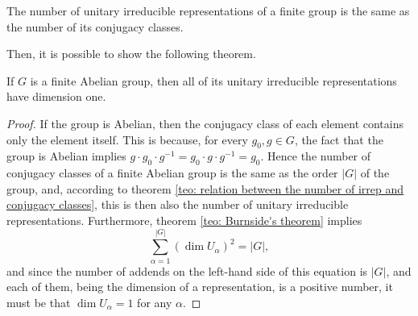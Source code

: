 \begin{teo}
\label{teo: relation between the number of irrep and conjugacy classes}
    The number of unitary irreducible representations of a finite group is the same as the number of its conjugacy classes.
\end{teo}
Then, it is possible to show the following theorem.
\begin{teo}
    If $G$ is a finite Abelian group, then all of its unitary irreducible representations have dimension one.
\end{teo}
\begin{proof}
    If the group is Abelian, then the conjugacy class of each element contains only the element itself. This is because, for every $g_0,g \in G$, the fact that the group is Abelian implies $g \cdot g_0 \cdot g^{-1} = g_0 \cdot g \cdot g^{-1} = g_0$. Hence the number of conjugacy classes of a finite Abelian group is the same as the order $|G|$ of the group, and, according to theorem \ref{teo: relation between the number of irrep and conjugacy classes}, this is then also the number of unitary irreducible representations. Furthermore, theorem \ref{teo: Burnside's theorem} implies 
    \begin{equation}
        \sum_{\alpha=1}^{|G|}(\dim{U_\alpha})^2 = |G|,
    \end{equation}
    and since the number of addends on the left-hand side of this equation is $|G|$, and each of them, being the dimension of a representation, is a positive number, it must be that $\dim{U_\alpha} = 1$ for any $\alpha$.
\end{proof}
